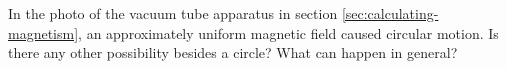 In the photo of the vacuum tube apparatus in section
\ref{sec:calculating-magnetism}, an approximately uniform magnetic field caused circular
motion. Is there any other possibility besides a circle?
What can happen in general?
